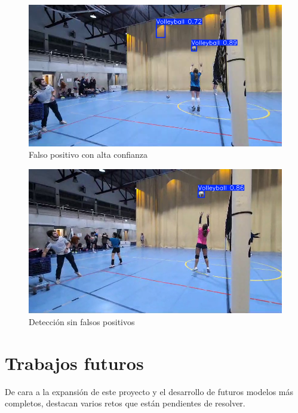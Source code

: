 \documentclass[12pt]{report} %
\begin{document}
    \begin{minipage}{0.45\textwidth}
        \begin{figure}[H]
        \includegraphics[width=\textwidth]{bola2.png}
        \caption{Falso positivo con alta confianza}
        \end{figure}
    \end{minipage}
    \hspace{0.5cm}
    \begin{minipage}{0.45\textwidth}
        \begin{figure}[H]
        \includegraphics[width=\textwidth]{bola3.png}
        \caption{Detección sin falsos positivos}
        \end{figure}
    \end{minipage}

    \chapter{Trabajos futuros}
    \label{chap:future}

    De cara a la expansión de este proyecto y el desarrollo de futuros modelos
    más completos, destacan varios retos que están pendientes de resolver.
\end{document}
